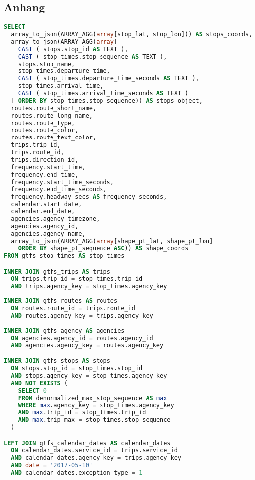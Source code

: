 \begin{newpage}
\section{Anhang}
\label{sec:anhang}

\begin{lstlisting}[captionpos=t, caption=Postgresql Datenbankabfrage von allen aktiven Trips mit ihrem dazugehörigen Linienverlauf, label=lst:get_active_trips_query, language=SQL]
SELECT 
  array_to_json(ARRAY_AGG(array[stop_lat, stop_lon])) AS stops_coords,
  array_to_json(ARRAY_AGG(array[
    CAST ( stops.stop_id AS TEXT ),
    CAST ( stop_times.stop_sequence AS TEXT ),
    stops.stop_name, 
    stop_times.departure_time,
    CAST ( stop_times.departure_time_seconds AS TEXT ),
    stop_times.arrival_time,
    CAST ( stop_times.arrival_time_seconds AS TEXT )
  ] ORDER BY stop_times.stop_sequence)) AS stops_object,
  routes.route_short_name,
  routes.route_long_name,
  routes.route_type,
  routes.route_color,
  routes.route_text_color,
  trips.trip_id, 
  trips.route_id,
  trips.direction_id,
  frequency.start_time, 
  frequency.end_time, 
  frequency.start_time_seconds,
  frequency.end_time_seconds,
  frequency.headway_secs AS frequency_seconds,
  calendar.start_date,
  calendar.end_date,
  agencies.agency_timezone,
  agencies.agency_id,
  agencies.agency_name,
  array_to_json(ARRAY_AGG(array[shape_pt_lat, shape_pt_lon] 
    ORDER BY shape_pt_sequence ASC)) AS shape_coords
FROM gtfs_stop_times AS stop_times

INNER JOIN gtfs_trips AS trips
  ON trips.trip_id = stop_times.trip_id 
  AND trips.agency_key = stop_times.agency_key
    
INNER JOIN gtfs_routes AS routes
  ON routes.route_id = trips.route_id 
  AND routes.agency_key = trips.agency_key
   
INNER JOIN gtfs_agency AS agencies
  ON agencies.agency_id = routes.agency_id 
  AND agencies.agency_key = routes.agency_key

INNER JOIN gtfs_stops AS stops 
  ON stops.stop_id = stop_times.stop_id
  AND stops.agency_key = stop_times.agency_key
  AND NOT EXISTS (
    SELECT 0
    FROM denormalized_max_stop_sequence AS max
    WHERE max.agency_key = stop_times.agency_key
    AND max.trip_id = stop_times.trip_id
    AND max.trip_max = stop_times.stop_sequence
  )

LEFT JOIN gtfs_calendar_dates AS calendar_dates
  ON calendar_dates.service_id = trips.service_id
  AND calendar_dates.agency_key = trips.agency_key
  AND date = '2017-05-10' 
  AND calendar_dates.exception_type = 1


\end{lstlisting}
\end{newpage}
